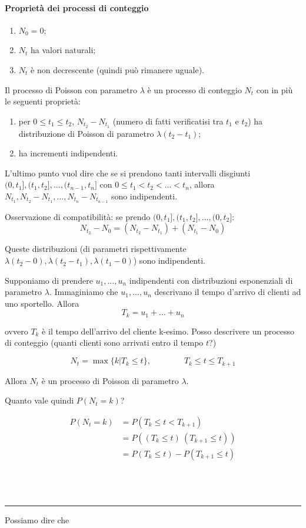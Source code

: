 \documentclass[a4paper,12pt]{book}
\begin{document}
\paragraph{Proprietà dei processi di conteggio}
\begin{enumerate}
	\item $ N_0 = 0 $;
	\item $ N_t $ ha valori naturali;
	\item $ N_t $ è non decrescente (quindi può rimanere uguale).
\end{enumerate}

Il processo di Poisson con parametro $\lambda$ è un processo di conteggio $ N_t $ con in più le seguenti proprietà:
\begin{enumerate}
	\item per $ 0 \le t_1 \le t_2 $, $ N_{t_2} - N_{t_1} $ (numero di fatti verificatisi tra $ t_1 $ e $ t_2 $) ha distribuzione di Poisson di parametro $\lambda(t_2 - t_1)$;
	\item ha incrementi indipendenti.
\end{enumerate}

L'ultimo punto vuol dire che se si prendono tanti intervalli disgiunti $ (0, t_1], (t_1, t_2], ..., (t_{n-1}, t_n] $  con $ 0 \le t_1 < t_2 < ... < t_n $, allora $ N_{t_1}, N_{t_2} - N_{t_1}, ..., N_{t_n} - N_{t_{n-1}} $ sono indipendenti.

Osservazione di compatibilità: se prendo $ (0, t_1 ], (t_1, t_2], ..., (0, t_2] $:
$$ N_{t_2} - N_0 = (N_{t_2} - N_{t_1}) + (N_{t_1} - N_0) $$

Queste distribuzioni (di parametri rispettivamente $\lambda(t_2 - 0),\lambda(t_2 - t_1),\lambda(t_1 - 0) $) sono indipendenti. 

Supponiamo di prendere $ u_1, ..., u_n $ indipendenti con distribuzioni esponenziali di parametro $\lambda$. Immaginiamo che $ u_1, ..., u_n $ descrivano il tempo d'arrivo di clienti ad uno sportello. Allora
$$ T_k = u_1 + ... + u_n $$

ovvero $ T_k $ è il tempo dell'arrivo del cliente k-esimo. Posso descrivere un processo di conteggio (quanti clienti sono arrivati entro il tempo $ t $?)

$$ N_t = \max \{k | T_k \le t \}, \qquad \qquad T_k \le t \le T_{k+1} $$

Allora $ N_t $ è un processo di Poisson di parametro $\lambda$.

Quanto vale quindi $ P(N_t = k) $?

\begin{align*}
	P(N_t = k) & = P(T_k \le t < T_{k+1}) \\
	& = P((T_k \le t) \ (T_{k+1} \le t)) \\
	& = P(T_k \le t) - P(T_{k+1} \le t)
\end{align*}
\\
\\
\\
\hrule\vfill
Possiamo dire che
\end{document}
